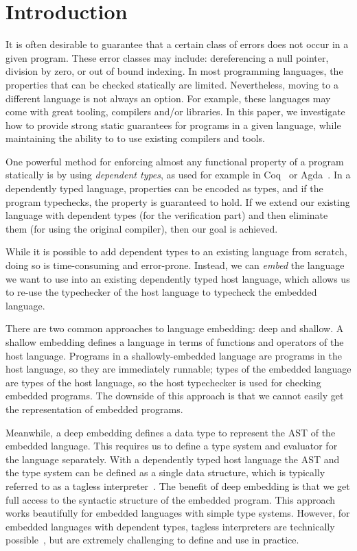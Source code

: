 \documentclass[sigplan,screen,anonymous,review]{acmart}
\begin{document}
\section{Introduction}\label{sec:introduction}

It is often desirable to guarantee that a
certain class of errors does not occur in a given program.  These
error classes may include: dereferencing a null pointer, division
by zero, or out of bound indexing.  In most
programming languages, the properties that can be checked
statically are limited.  Nevertheless, moving to a different
language is not always an option.  For example, these languages may
come with great tooling, compilers and/or libraries.  In this paper, we
investigate how to provide strong static guarantees for programs in a
given language, while maintaining the ability to to use existing
compilers and tools.

One powerful method for enforcing almost any functional property of a
program statically is by using \emph{dependent types}, as used for
example in Coq~\cite{Coq-8-13-2} or Agda~\cite{agda-2-6-2}.  In a
dependently typed language, properties can be encoded as types, and if
the program typechecks, the property is guaranteed to hold.  If we
extend our existing language with dependent types (for the verification
part) and then eliminate them (for using the original compiler), then
our goal is achieved.

While it is possible to add dependent types to an existing language
from scratch, doing so is time-consuming and error-prone.  Instead,
we can \emph{embed} the language we want to use into an existing
dependently typed host language, which allows us to re-use the typechecker
of the host language to typecheck the embedded language.

There are two common approaches to language embedding: deep and shallow.
A shallow embedding defines a language in terms of functions and operators
of the host language.  Programs in a shallowly-embedded language are programs
in the host language, so they are immediately run\-nable; types of the embedded
language are types of the host language, so the host typechecker is used for
checking embedded programs.  The downside of this approach is that we cannot
easily get the representation of embedded programs.

Meanwhile, a deep embedding defines a data type to represent the AST
of the embedded language.  This requires us to define a type system
and evaluator for the language separately.  With a dependently typed
host language the AST and the type system can be defined as a single
data structure, which is typically referred to as a tagless
interpreter~\citep{PasalicTS02}.  The benefit of deep embedding is that we get
full access to the syntactic structure of the embedded program.  This
approach works beautifully for embedded languages with simple type
systems. However, for embedded languages with dependent types, tagless
interpreters are technically
possible~\citep{CHAPMAN200921,10.1007/978-3-540-74464-1_7}, but are
extremely challenging to define and use in practice.
\end{document}

